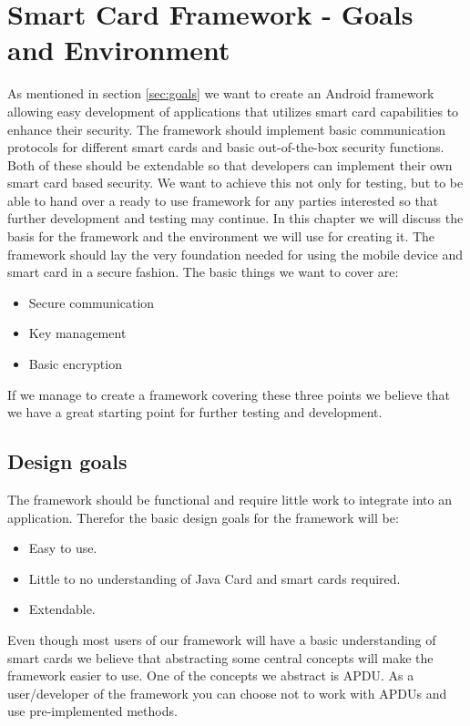 \chapter{Smart Card Framework - Goals and Environment}
\label{ch:frameworkGoals}
As mentioned in section \ref{sec:goals} we want to create an Android framework allowing easy development of applications that utilizes smart card capabilities to enhance their security. The framework should implement basic communication protocols for different smart cards and basic out-of-the-box security functions. Both of these should be extendable so that developers can implement their own smart card based security. We want to achieve this not only for testing, but to be able to hand over a ready to use framework for any parties interested so that further development and testing may continue. In this chapter we will discuss the basis for the framework and the environment we will use for creating it.
The framework should lay the very foundation needed for using the mobile device and smart card in a secure fashion. The basic things we want to cover are:
\begin{itemize}
    \item Secure communication
    \item Key management
    \item Basic encryption
\end{itemize}
If we manage to create a framework covering these three points we believe that we have a great starting point for further testing and development.

\section{Design goals}
\label{sec:designAndroidGoals}
The framework should be functional and require little work to integrate into an application. Therefor the basic design goals for the framework will be:
\begin{itemize}
    \item Easy to use.
    \item Little to no understanding of Java Card and smart cards required.
    \item Extendable.
\end{itemize}

Even though most users of our framework will have a basic understanding of smart cards we believe that abstracting some central concepts will make the framework easier to use. One of the concepts we abstract is APDU. As a user/developer of the framework you can choose not to work with APDUs and use pre-implemented methods.

